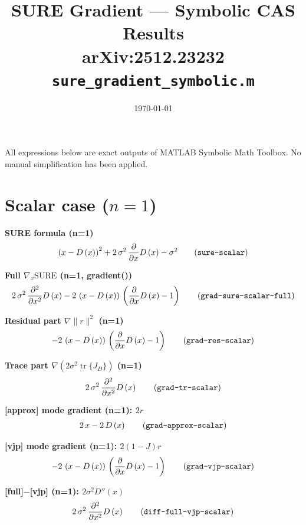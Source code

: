 \documentclass{article}
\title{SURE Gradient --- Symbolic CAS Results\\{\large arXiv:2512.23232 \quad \texttt{sure\_gradient\_symbolic.m}}}
\date{\today}
\begin{document}
\maketitle

\noindent All expressions below are exact outputs of MATLAB Symbolic
Math Toolbox.  No manual simplification has been applied.

\section{Scalar case ($n=1$)}

\noindent\textbf{SURE formula  (n=1)}
\begin{align}
  {\left(x-D\left(x\right)\right)}^2+2\,\sigma ^2\,\frac{\partial }{\partial x} D\left(x\right)-\sigma ^2 \tag{\texttt{sure-scalar}}
\end{align}

\noindent\textbf{Full $\nabla_x \mathrm{SURE}$  (n=1, gradient())}
\begin{align}
  2\,\sigma ^2\,\frac{\partial ^2}{\partial x^2} D\left(x\right)-2\,\left(x-D\left(x\right)\right)\,\left(\frac{\partial }{\partial x} D\left(x\right)-1\right) \tag{\texttt{grad-sure-scalar-full}}
\end{align}

\noindent\textbf{Residual part $\nabla\|r\|^2$  (n=1)}
\begin{align}
  -2\,\left(x-D\left(x\right)\right)\,\left(\frac{\partial }{\partial x} D\left(x\right)-1\right) \tag{\texttt{grad-res-scalar}}
\end{align}

\noindent\textbf{Trace part $\nabla(2\sigma^2 \operatorname{tr}\{J_D\})$  (n=1)}
\begin{align}
  2\,\sigma ^2\,\frac{\partial ^2}{\partial x^2} D\left(x\right) \tag{\texttt{grad-tr-scalar}}
\end{align}

\noindent\textbf{[approx] mode gradient  (n=1): $2r$}
\begin{align}
  2\,x-2\,D\left(x\right) \tag{\texttt{grad-approx-scalar}}
\end{align}

\noindent\textbf{[vjp] mode gradient  (n=1): $2(1-J)r$}
\begin{align}
  -2\,\left(x-D\left(x\right)\right)\,\left(\frac{\partial }{\partial x} D\left(x\right)-1\right) \tag{\texttt{grad-vjp-scalar}}
\end{align}

\noindent\textbf{[full]$-$[vjp]  (n=1):  $2\sigma^2 D''(x)$}
\begin{align}
  2\,\sigma ^2\,\frac{\partial ^2}{\partial x^2} D\left(x\right) \tag{\texttt{diff-full-vjp-scalar}}
\end{align}
\end{document}
